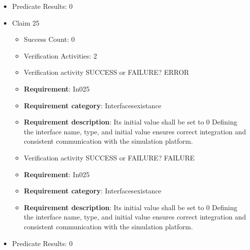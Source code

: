 \documentclass{article}
\begin{document}
\begin{itemize}
\begin{itemize}
					\item Verification activity SUCCESS or FAILURE? FAILURE
		
						\item \textbf{Requirement}: In024 
						\item \textbf{Requirement category}: Interfacesexistance 
						\item \textbf{Requirement description}: Its initial value shall be scenarioDefault Defining the interface name, type, and initial value ensures correct integration and consistent communication with the simulation platform.
					
				\end{itemize}
				
									    
				\item Predicate Results: 0

  				  \item Claim 25
				\begin{itemize}
			    	\item Success Count: 0 
			    	\item Verification Activities: 2
					\item Verification activity SUCCESS or FAILURE? ERROR
		
						\item \textbf{Requirement}: In025 
						\item \textbf{Requirement category}: Interfacesexistance 
						\item \textbf{Requirement description}: Its initial value shall be set to 0 Defining the interface name, type, and initial value ensures correct integration and consistent communication with the simulation platform.
					
					\item Verification activity SUCCESS or FAILURE? FAILURE
		
						\item \textbf{Requirement}: In025 
						\item \textbf{Requirement category}: Interfacesexistance 
						\item \textbf{Requirement description}: Its initial value shall be set to 0 Defining the interface name, type, and initial value ensures correct integration and consistent communication with the simulation platform.
					
				\end{itemize}
				
									    
				\item Predicate Results: 0


\end{itemize}
\end{document}
